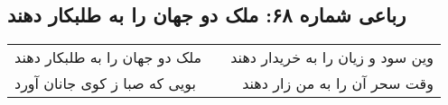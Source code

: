 \begin{center}
\section*{رباعی شماره ۶۸: ملک دو جهان را به طلبکار دهند}
\label{sec:068}
\begin{longtable}{l p{0.5cm} r}
ملک دو جهان را به طلبکار دهند
&&
وین سود و زیان را به خریدار دهند
\\
بویی که صبا ز کوی جانان آورد
&&
وقت سحر آن را به من زار دهند
\\
\end{longtable}
\end{center}
